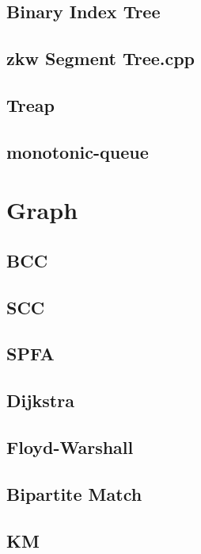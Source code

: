 \documentclass[a4paper,10pt,twocolumn,oneside]{article}
\begin{document}
\subsection{Binary Index Tree}

\subsection{zkw Segment Tree.cpp}

\subsection{Treap}

\subsection{monotonic-queue}


\section{Graph}
\subsection{BCC}

\subsection{SCC}

\subsection{SPFA}

\subsection{Dijkstra}

\subsection{Floyd-Warshall}

\subsection{Bipartite Match}

\subsection{KM}

\end{document}
